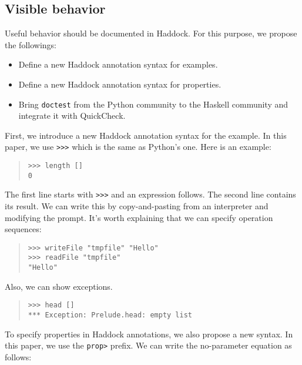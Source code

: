 \documentclass[preprint]{sigplanconf}
\begin{document}
\subsection{Visible behavior}
\label{sec:Visible-behavior}

Useful behavior should be documented in Haddock.
For this purpose, we propose the followings:

\begin{itemize}
\item Define a new Haddock annotation syntax for examples.
\item Define a new Haddock annotation syntax for properties.
\item Bring {\tt doctest} from the Python community to the Haskell
community and integrate it with QuickCheck.
\end{itemize}

First, we introduce a new Haddock annotation syntax for the example.
In this paper, we use {\tt >>>} which is the same as Python's one.
Here is an example:

\begin{quote}
\small
\begin{verbatim}
>>> length []
0
\end{verbatim}
\end{quote}

\noindent The first line starts with {\tt >>>} and an expression follows. The second line contains its result. We can write this by copy-and-pasting from an interpreter and modifying the prompt.
It's worth explaining that we can specify operation sequences:

\begin{quote}
\small
\begin{verbatim}
>>> writeFile "tmpfile" "Hello"
>>> readFile "tmpfile"
"Hello"
\end{verbatim}
\end{quote}

\noindent Also, we can show exceptions.

\begin{quote}
\small
\begin{verbatim}
>>> head []
*** Exception: Prelude.head: empty list
\end{verbatim}
\end{quote}

To specify properties in Haddock annotations, we also propose a new syntax. In this paper, we use the {\tt prop>} prefix. We can write the no-parameter equation as follows:
\end{document}
